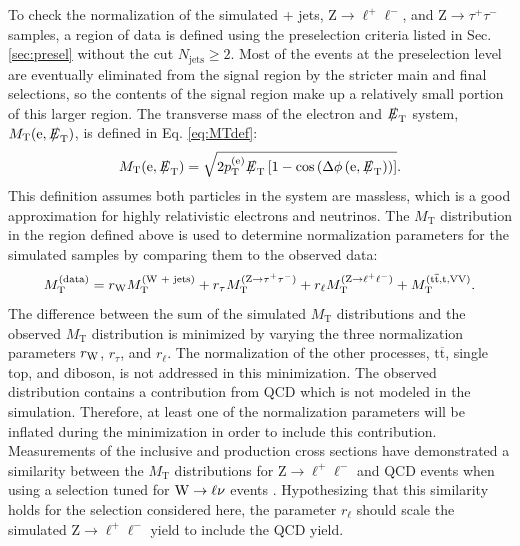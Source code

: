 \documentclass[12pt]{thesis}  %
\newcommand{\Pe}{\ensuremath{\cmsSymbolFace{e}}\xspace}
\def\eslash{\ensuremath{{\hbox{$E$\kern-0.6em\lower-.05ex\hbox{/}\kern0.10em}}}}
\def\met{\mbox{$\eslash_\text{T}$}\xspace} %
\renewcommand{\ttbar}{\ensuremath{\mathrm{t}\overline{\mathrm{t}}}\xspace}
\newcommand{\PZ}{\ensuremath{{\mathrm{Z}}}\xspace}%
\newcommand{\ra}{\ensuremath{\rightarrow}}%
\newcommand{\TpTm}{\ensuremath{\tau^+\tau^-}}%
\newcommand{\LpLm}{\ensuremath{\ell^+\ell^-}}%
\newcommand{\MT}{\ensuremath{{M}_{\text{T}}}\xspace}%
\newcommand{\Ztt}{\ensuremath{\PZ \ra \TpTm}\xspace}%
\newcommand{\Wln}{\ensuremath{\W \rightarrow \ell\nu}\xspace}%
\newcommand{\Zll}{\ensuremath{\PZ \ra \LpLm}\xspace}%
\begin{document}
To check the normalization of the simulated \W + jets, \Zll, and \Ztt samples, a region of data is defined using the preselection criteria listed in Sec. \ref{sec:presel} without the cut $N_{\text{jets}}\geq2$. Most of the events at the preselection level are eventually eliminated from the signal region by the stricter main and final selections, so the contents of the signal region make up a relatively small portion of this larger region. The transverse mass of the electron and \met system, $\MT(\Pe,\met)$, is defined in Eq. \eqref{eq:MTdef}:
\begin{equation}
\MT(\Pe,\met) = \sqrt{2\pt^{(\Pe)}\met\left[1-\text{cos}\left(\Delta\phi\left(\Pe,\met\right)\right)\right]}. \label{eq:MTdef}
\end{equation}
This definition assumes both particles in the system are massless, which is a good approximation for highly relativistic electrons and neutrinos. The \MT distribution in the region defined above is used to determine normalization parameters for the simulated samples by comparing them to the observed data:
\begin{equation}
\MT^{\text{(data)}} = r_{\W}\MT^{\text{(\W + jets)}} + r_{\tau}\MT^{(\Ztt)} + r_{\ell}\MT^{(\Zll)} + \MT^{\text{(\ttbar,\cPqt,VV)}}. \label{Bkg:eq:MTmin}
\end{equation}
The difference between the sum of the simulated \MT distributions and the observed \MT distribution is minimized by varying the three normalization parameters $r_{\mathrm{W}}$, $r_{\tau}$, and $r_{\ell}$. The normalization of the other processes, \ttbar, single top, and diboson, is not addressed in this minimization. The observed distribution contains a contribution from QCD which is not modeled in the simulation. Therefore, at least one of the normalization parameters will be inflated during the minimization in order to include this contribution. Measurements of the inclusive \W and \Z production cross sections have demonstrated a similarity between the \MT distributions for \Zll and QCD events when using a selection tuned for \Wln events \cite{CMS-AN-2010-359,CMS:2011aa}. Hypothesizing that this similarity holds for the selection considered here, the parameter $r_{\ell}$ should scale the simulated \Zll yield to include the QCD yield.
\end{document}
